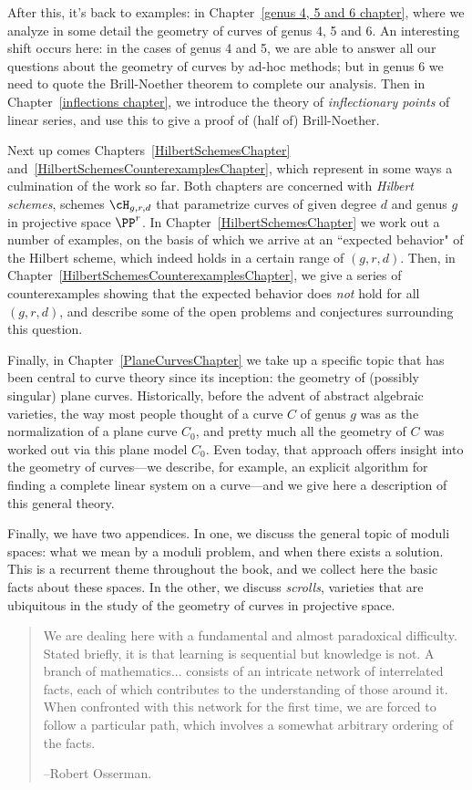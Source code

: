 After this, it's back to examples: in Chapter~\ref{genus 4, 5 and 6 chapter}, where we analyze in some detail the geometry of curves of genus 4, 5 and 6. An interesting shift occurs here: in the cases of genus 4 and 5, we are able to answer all our questions about the geometry of curves by ad-hoc methods; but in genus 6 we need to quote the Brill-Noether theorem to complete our analysis. Then in Chapter~\ref{inflections chapter}, we introduce the theory of \emph{inflectionary points} of linear series, and use this to give a proof of (half of) Brill-Noether.

Next up comes Chapters~\ref{HilbertSchemesChapter} and~\ref{HilbertSchemesCounterexamplesChapter}, which represent in some ways a culmination of the work so far. Both chapters are concerned with \emph{Hilbert schemes}, schemes $\cH_{g,r,d}$ that parametrize curves of given degree $d$ and genus $g$ in projective space $\PP^r$. In Chapter~\ref{HilbertSchemesChapter} we work out a number of examples, on the basis of which we arrive at an ``expected behavior" of the Hilbert scheme, which indeed holds in a certain range of $(g,r,d)$. Then, in Chapter~\ref{HilbertSchemesCounterexamplesChapter}, we give a series of counterexamples showing that the expected behavior does \emph{not} hold for all $(g,r,d)$, and describe some of the open problems and conjectures surrounding this question.

Finally, in Chapter~\ref{PlaneCurvesChapter} we take up a specific topic that has been central to curve theory since its inception: the geometry of (possibly singular) plane curves. Historically, before the advent of abstract algebraic varieties, the way most people thought of a curve $C$ of genus $g$ was as the normalization of a plane curve $C_0$, and pretty much all the geometry of $C$ was worked out via this plane model $C_0$. Even today, that approach offers insight into the geometry of curves---we describe, for example, an explicit algorithm for finding a complete linear system on a curve---and we give here a description of this general theory.

Finally, we have two appendices. In one, we discuss the general topic of moduli spaces: what we mean by a moduli problem, and when there exists a solution. This is a recurrent theme throughout the book, and we collect here the basic facts about these spaces. In the other, we discuss \emph{scrolls}, varieties that are ubiquitous in the study of the geometry of curves in projective space.

\begin{quote}
\small\sf
We are dealing here with a fundamental and almost paradoxical difficulty. Stated briefly, it is that learning is sequential but knowledge is not. A branch of mathematics... consists of an intricate network  of interrelated facts, each of which contributes to the understanding of those around it. When confronted with this network for the first time, we are forced to follow a particular path, which involves a somewhat arbitrary ordering of the facts.

--Robert Osserman.

\end{quote}



